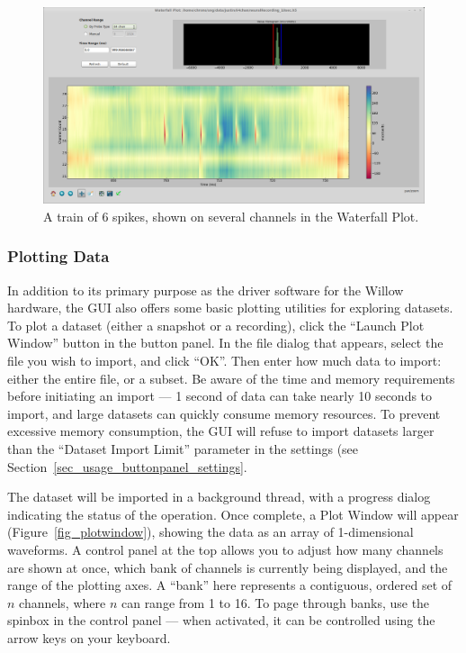 \begin{figure}[h!]
\begin{center}
\includegraphics[width=17cm]{screenshots/waterfall_zoom.png}
\end{center}
\caption{A train of 6 spikes, shown on several channels in the Waterfall Plot.}
\label{fig_waterfall_zoom}
\end{figure}
\subsubsection{Plotting Data}
\label{sec_usage_buttonpanel_plot}

In addition to its primary purpose as the driver software for the Willow hardware, the GUI also offers some basic plotting utilities for exploring datasets. To plot a dataset (either a snapshot or a recording), click the ``Launch Plot Window'' button in the button panel. In the file dialog that appears, select the file you wish to import, and click ``OK''. Then enter how much data to import: either the entire file, or a subset. Be aware of the time and memory requirements before initiating an import --- 1 second of data can take nearly 10 seconds to import, and large datasets can quickly consume memory resources. To prevent excessive memory consumption, the GUI will refuse to import datasets larger than the ``Dataset Import Limit'' parameter in the settings (see Section~\ref{sec_usage_buttonpanel_settings}.

The dataset will be imported in a background thread, with a progress dialog indicating the status of the operation. Once complete, a Plot Window will appear (Figure~\ref{fig_plotwindow}), showing the data as an array of 1-dimensional waveforms. A control panel at the top allows you to adjust how many channels are shown at once, which bank of channels is currently being displayed, and the range of the plotting axes. A ``bank'' here represents a contiguous, ordered set of $n$ channels, where $n$ can range from 1 to 16. To page through banks, use the spinbox in the control panel --- when activated, it can be controlled using the arrow keys on your keyboard.

